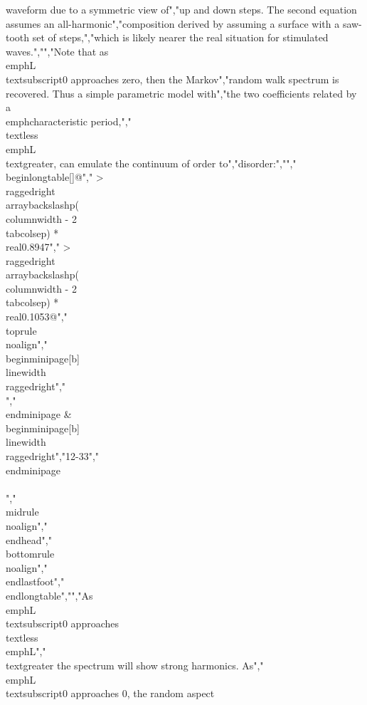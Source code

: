 {{{{{{{{{{waveform due to a symmetric view of","up and down steps. The second equation assumes an all-harmonic","composition derived by assuming a surface with a saw-tooth set of steps,","which is likely nearer the real situation for stimulated waves.","","Note that as \\emph{L\\textsubscript{0}} approaches zero, then the Markov","random walk spectrum is recovered. Thus a simple parametric model with","the two coefficients related by a \\emph{characteristic period,}","\\textless{} \\emph{L} \\textgreater, can emulate the continuum of order to","disorder:","","\\begin{longtable}[]{@{}","  >{\\raggedright\\arraybackslash}p{(\\columnwidth - 2\\tabcolsep) * \\real{0.8947}}","  >{\\raggedright\\arraybackslash}p{(\\columnwidth - 2\\tabcolsep) * \\real{0.1053}}@{}}","\\toprule\\noalign{}","\\begin{minipage}[b]{\\linewidth}\\raggedright","\\[\\left\\langle L \\right\\rangle = L_{0} + 1/\\alpha\\]","\\end{minipage} & \\begin{minipage}[b]{\\linewidth}\\raggedright","12-33","\\end{minipage} \\\\","\\midrule\\noalign{}","\\endhead","\\bottomrule\\noalign{}","\\endlastfoot","\\end{longtable}","","As \\emph{L\\textsubscript{0}} approaches \\textless{} \\emph{L}","\\textgreater{} the spectrum will show strong harmonics. As","\\emph{L\\textsubscript{0}} approaches 0, the random aspect }}}}}}}}}}
